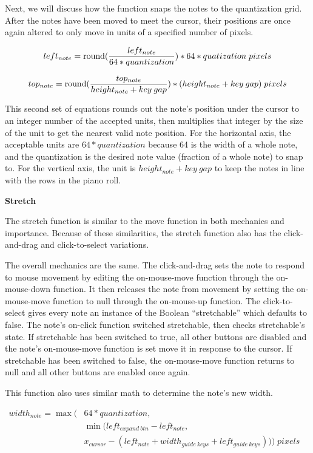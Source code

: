 Next, we will discuss how the function snaps the notes to the quantization grid. After the notes
have been moved to meet the cursor, their positions are once again altered to only move in units of
a specified number of pixels.

\begin{equation} \label{vert_snap}
  left_{note} = \operatorname{round}(\frac{left_{note}}{64 * quantization}) * 64 * quatization \;pixels
\end{equation}

\begin{equation} \label{horz_snap}
  top_{note} = \operatorname{round}(\frac{top_{note}}{height_{note} + key\:gap}) * (height_{note} + key\:gap) \;pixels
\end{equation}

This second set of equations rounds out the note’s position under the cursor to an integer number
of the accepted units, then multiplies that integer by the size of the unit to get the nearest
valid note position. For the horizontal axis, the acceptable units are $ 64 * quantization $
because 64 is the width of a whole note, and the quantization is the desired note value (fraction
of a whole note) to snap to. For the vertical axis, the unit is $ height_{note} + key\:gap $ to
keep the notes in line with the rows in the piano roll.

\textbf{Stretch}

The stretch function is similar to the move function in both mechanics and importance. Because of
these similarities, the stretch function also has the click-and-drag and click-to-select variations.

The overall mechanics are the same. The click-and-drag sets the note to respond to mouse movement
by editing the on-mouse-move function through the on-mouse-down function. It then releases the note
from movement by setting the on-mouse-move function to null through the on-mouse-up function. The
click-to-select gives every note an instance of the Boolean “stretchable” which defaults to false.
The note’s on-click function switched stretchable, then checks stretchable’s state. If stretchable
has been switched to true, all other buttons are disabled and the note’s on-mouse-move function is
set move it in response to the cursor. If stretchable has been switched to false, the on-mouse-move
function returns to null and all other buttons are enabled once again.

This function also uses similar math to determine the note’s new width.

\begin{align} \label{stretch}
  width_{note} = \max( & 64 * quantization, \\
  & \min(left_{expand\:btn} - left_{note}, \\
  & x_{cursor} - (left_{note} + width_{guide\:keys} + left_{guide\:keys}))) \;pixels &
\end{align}


